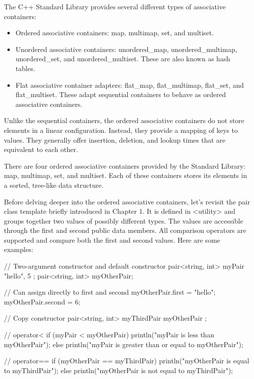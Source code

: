 

The C++ Standard Library provides several different types of associative containers:

\begin{itemize}
\item
Ordered associative containers: map, multimap, set, and multiset.

\item
Unordered associative containers: unordered\_map, unordered\_multimap, unordered\_set, and unordered\_multiset. These are also known as hash tables.

\item
Flat associative container adapters: flat\_map, flat\_multimap, flat\_set, and flat\_multiset. These adapt sequential containers to behave as ordered associative containers.

\end{itemize}


Unlike the sequential containers, the ordered associative containers do not store elements in a linear configuration. Instead, they provide a mapping of keys to values. They generally offer insertion, deletion, and lookup times that are equivalent to each other.

There are four ordered associative containers provided by the Standard Library: map, multimap, set, and multiset. Each of these containers stores its elements in a sorted, tree-like data structure.


Before delving deeper into the ordered associative containers, let’s revisit the pair class template briefly introduced in Chapter 1. It is defined in <utility> and groups together two values of possibly different types. The values are accessible through the first and second public data members. All comparison operators are supported and compare both the first and second values. Here are some examples:

\begin{cpp}
// Two-argument constructor and default constructor
pair<string, int> myPair { "hello", 5 };
pair<string, int> myOtherPair;

// Can assign directly to first and second
myOtherPair.first = "hello";
myOtherPair.second = 6;

// Copy constructor
pair<string, int> myThirdPair { myOtherPair };

// operator<
if (myPair < myOtherPair) {
    println("myPair is less than myOtherPair");
} else {
    println("myPair is greater than or equal to myOtherPair");
}

// operator==
if (myOtherPair == myThirdPair) {
    println("myOtherPair is equal to myThirdPair");
} else {
    println("myOtherPair is not equal to myThirdPair");
}
\end{cpp}

